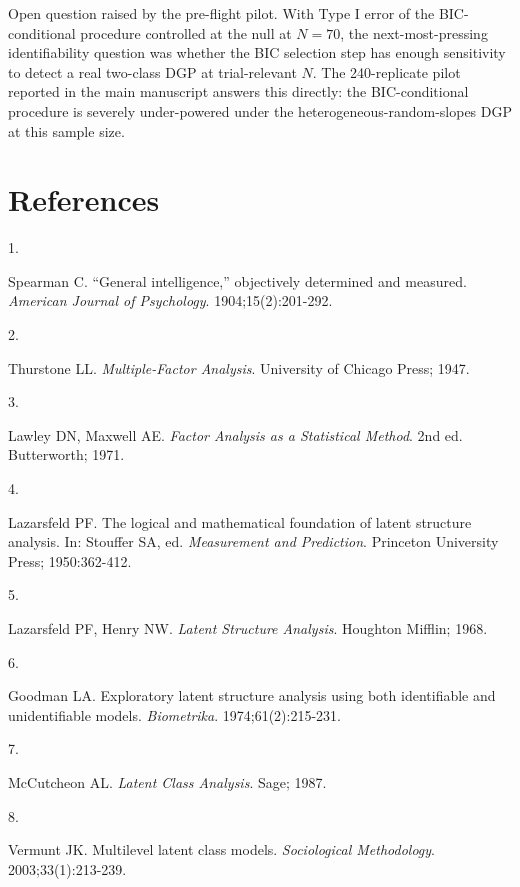 \documentclass[
  11pt,
]{article}
\newlength{\cslhangindent}
\newlength{\csllabelwidth}
\newenvironment{CSLReferences}[2] %
 {\begin{list}{}{%
  \setlength{\itemindent}{0pt}
  \setlength{\leftmargin}{0pt}
  \setlength{\parsep}{0pt}
  \ifodd #1
   \setlength{\leftmargin}{\cslhangindent}
   \setlength{\itemindent}{-1\cslhangindent}
  \fi
  \setlength{\itemsep}{#2\baselineskip}}}
 {\end{list}}
\newcommand{\CSLLeftMargin}[1]{\parbox[t]{\csllabelwidth}{\strut#1\strut}}
\newcommand{\CSLRightInline}[1]{\parbox[t]{\linewidth - \csllabelwidth}{\strut#1\strut}}
\begin{document}
Open question raised by the pre-flight pilot. With Type I error of the
BIC-conditional procedure controlled at the null at \(N = 70\), the
next-most-pressing identifiability question was whether the BIC
selection step has enough sensitivity to detect a real two-class DGP at
trial-relevant \(N\). The 240-replicate pilot reported in the main
manuscript answers this directly: the BIC-conditional procedure is
severely under-powered under the heterogeneous-random-slopes DGP at
this sample size.

\section{References}\label{references}

\protect{}\label{refs}
\begin{CSLReferences}{0}{1}
\CSLLeftMargin{1. }%
\CSLRightInline{Spearman C. {{``General intelligence,''} objectively determined and measured}. \emph{American Journal of Psychology}. 1904;15(2):201-292.}

\CSLLeftMargin{2. }%
\CSLRightInline{Thurstone LL. \emph{Multiple-Factor Analysis}. University of Chicago Press; 1947.}

\CSLLeftMargin{3. }%
\CSLRightInline{Lawley DN, Maxwell AE. \emph{Factor Analysis as a Statistical Method}. 2nd ed. Butterworth; 1971.}

\CSLLeftMargin{4. }%
\CSLRightInline{Lazarsfeld PF. The logical and mathematical foundation of latent structure analysis. In: Stouffer SA, ed. \emph{Measurement and Prediction}. Princeton University Press; 1950:362-412.}

\CSLLeftMargin{5. }%
\CSLRightInline{Lazarsfeld PF, Henry NW. \emph{Latent Structure Analysis}. Houghton Mifflin; 1968.}

\CSLLeftMargin{6. }%
\CSLRightInline{Goodman LA. Exploratory latent structure analysis using both identifiable and unidentifiable models. \emph{Biometrika}. 1974;61(2):215-231.}

\CSLLeftMargin{7. }%
\CSLRightInline{McCutcheon AL. \emph{Latent Class Analysis}. Sage; 1987.}

\CSLLeftMargin{8. }%
\CSLRightInline{Vermunt JK. Multilevel latent class models. \emph{Sociological Methodology}. 2003;33(1):213-239.}


\end{CSLReferences}
\end{document}
